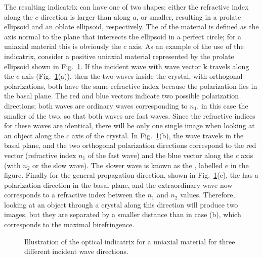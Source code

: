 The resulting indicatrix can have one of two shapes: either the refractive index along the $c$ direction is  larger than along $a$, or smaller, resulting in a prolate ellipsoid and an oblate ellipsoid, respectively.   The  of the material is defined as the axis normal to the plane that intersects the ellipsoid in a perfect circle; for a uniaxial material this is obviously the $c$ axis.  As an example of the use of the indicatrix, consider a positive uniaxial material represented by the prolate ellipsoid shown in Fig.~\ref{\chabbr:fig:uniaxial}.  If the incident wave with wave vector $\mathbf{k}$ travels along the $c$ axis (Fig.~\ref{\chabbr:fig:uniaxial}(a)), then the two waves inside the crystal, with orthogonal polarizations, both have the same refractive index because the polarization lies in the basal plane.  The red and blue vectors indicate two possible polarization directions; both waves are ordinary waves corresponding to $n_1$, in this case the smaller of the two, so that both waves are fast waves. Since the refractive indices for these waves are identical, there will be only one single image when looking at an object along the $c$ axis of the crystal.  In Fig.~\ref{\chabbr:fig:uniaxial}(b), the wave travels in the basal plane, and the two orthogonal polarization directions correspond to the red vector (refractive index $n_1$ of the fast wave) and the blue vector along the $c$ axis (with $n_2$ or the slow wave).  The slower wave is known as the , labelled $e$ in the figure.  Finally for the general propagation direction, shown in Fig.~\ref{\chabbr:fig:uniaxial}(c), the  has a polarization direction in the basal plane, and the extraordinary wave now corresponds to a refractive index between the $n_1$ and $n_2$ values. Therefore, looking at an object through a crystal along this direction will produce two images, but they are separated by a smaller distance than in case (b), which corresponds to the maximal birefringence.

\begin{figure}[h]
\centering\leavevmode
\caption{Illustration of the optical indicatrix for a uniaxial material for three different incident wave directions.}
\label{\chabbr:fig:uniaxial}
\end{figure}

